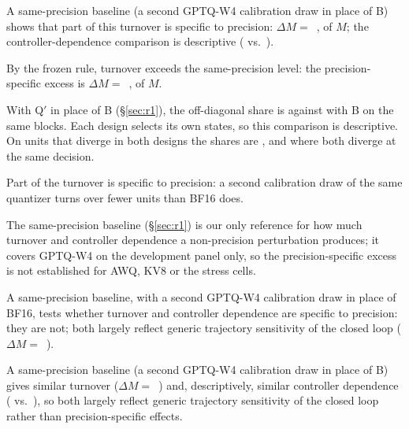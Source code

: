 A same-precision baseline (a second GPTQ-W4 calibration draw in place of B) shows that part of this turnover is specific to precision: $\Delta M=$~\pp{},  of $M$; the controller-dependence comparison is descriptive ( vs.\ ). %

By the frozen rule, turnover exceeds the same-precision level: the precision-specific excess is $\Delta M=$~\pp{},  of $M$. %

With Q$'$ in place of B (\S\ref{sec:r1}), the off-diagonal share is  against  with B on the same blocks. Each design selects its own states, so this comparison is descriptive. On units that diverge in both designs the shares are , and  where both diverge at the same decision. %

Part of the turnover is specific to precision: a second calibration draw of the same quantizer turns over \pp{} fewer units than BF16 does.

The same-precision baseline (\S\ref{sec:r1}) is our only reference for how much turnover and controller dependence a non-precision perturbation produces; it covers GPTQ-W4 on the development panel only, so the precision-specific excess is not established for AWQ, KV8 or the stress cells.

A same-precision baseline, with a second GPTQ-W4 calibration draw in place of BF16, tests whether turnover and controller dependence are specific to precision: they are not; both largely reflect generic trajectory sensitivity of the closed loop ($\Delta M=$~\pp{}). %

A same-precision baseline (a second GPTQ-W4 calibration draw in place of B) gives similar turnover ($\Delta M=$~\pp{}) and, descriptively, similar controller dependence ( vs.\ ), so both largely reflect generic trajectory sensitivity of the closed loop rather than precision-specific effects. %

